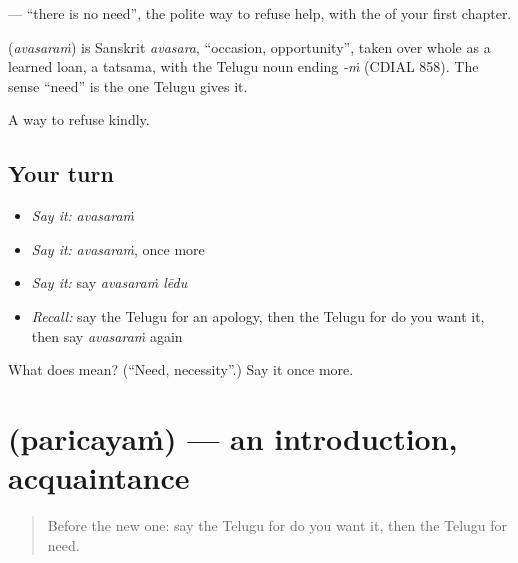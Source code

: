\textbf{ } — \textquotedblleft{}there is no need\textquotedblright{}, the polite way to refuse help, with the \textbf{} of your first chapter.

\begin{cousinweb}
\textbf{} (\emph{avasaraṁ}) is Sanskrit \emph{avasara}, \textquotedblleft{}occasion, opportunity\textquotedblright{}, taken over whole as a learned loan, a tatsama, with the Telugu noun ending \emph{-ṁ} (CDIAL 858). The sense \textquotedblleft{}need\textquotedblright{} is the one Telugu gives it.
\end{cousinweb}

\begin{grammarlens}[title={What you've built}]
A way to refuse kindly.
\end{grammarlens}

\subsection*{Your turn}
\begin{itemize}
\raggedright
  \item \emph{Say it:} \emph{avasaraṁ}
  \item \emph{Say it:} \emph{avasaraṁ}, once more
  \item \emph{Say it:} say \emph{avasaraṁ lēdu}
  \item \emph{Recall:} say the Telugu for an apology, then the Telugu for do you want it, then say \emph{avasaraṁ} again
\end{itemize}

\begin{tcolorbox}[breakable,colback=teal!4,colframe=teal!35!black,title={Before you move on}]
What does  mean? (\textquotedblleft{}Need, necessity\textquotedblright{}.) Say it once more.
\end{tcolorbox}
\section[\texorpdfstring{\te{పరిచయం} (paricayaṁ)}{పరిచయం (paricayaṁ)}]{ (paricayaṁ) — an introduction, acquaintance}

\label{lesson:TE-C94-introduction}



\begin{quote}
Before the new one: say the Telugu for do you want it, then the Telugu for need.
\end{quote}

